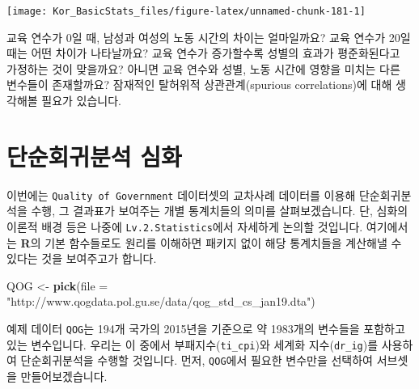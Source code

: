 \documentclass[]{book}
\newenvironment{Shaded}{\begin{snugshade}}{\end{snugshade}}
\newcommand{\DataTypeTok}[1]{\textcolor[rgb]{0.13,0.29,0.53}{#1}}
\newcommand{\KeywordTok}[1]{\textcolor[rgb]{0.13,0.29,0.53}{\textbf{#1}}}
\newcommand{\NormalTok}[1]{#1}
\newcommand{\OperatorTok}[1]{\textcolor[rgb]{0.81,0.36,0.00}{\textbf{#1}}}
\newcommand{\StringTok}[1]{\textcolor[rgb]{0.31,0.60,0.02}{#1}}
\begin{document}
\begin{itemize}
  \begin{center}\texttt{[image: Kor\_BasicStats\_files/figure-latex/unnamed-chunk-181-1]} \end{center}
\end{itemize}

교육 연수가 0일 때, 남성과 여성의 노동 시간의 차이는 얼마일까요? 교육 연수가 20일 때는 어떤 차이가 나타날까요? 교육 연수가 증가할수록 성별의 효과가 평준화된다고 가정하는 것이 맞을까요? 아니면 교육 연수와 성별, 노동 시간에 영향을 미치는 다른 변수들이 존재할까요? 잠재적인 탈허위적 상관관계(spurious correlations)에 대해 생각해볼 필요가 있습니다.

\hypertarget{uxb2e8uxc21cuxd68cuxadc0uxbd84uxc11d-uxc2ecuxd654}{%
\section{단순회귀분석 심화}\label{uxb2e8uxc21cuxd68cuxadc0uxbd84uxc11d-uxc2ecuxd654}}

이번에는 \texttt{Quality\ of\ Government} 데이터셋의 교차사례 데이터를 이용해 단순회귀분석을 수행, 그 결과표가 보여주는 개별 통계치들의 의미를 살펴보겠습니다. 단, 심화의 이론적 배경 등은 나중에 \texttt{Lv.2.Statistics}에서 자세하게 논의할 것입니다. 여기에서는 \textbf{R}의 기본 함수들로도 원리를 이해하면 패키지 없이 해당 통계치들을 계산해낼 수 있다는 것을 보여주고가 합니다.

\begin{Shaded}
\begin{Highlighting}[]
\NormalTok{QOG <-}\StringTok{ }\KeywordTok{pick}\NormalTok{(}\DataTypeTok{file =} \StringTok{"http://www.qogdata.pol.gu.se/data/qog_std_cs_jan19.dta"}\NormalTok{)}
\end{Highlighting}
\end{Shaded}

예제 데이터 \texttt{QOG}는 194개 국가의 2015년을 기준으로 약 1983개의 변수들을 포함하고 있는 변수입니다. 우리는 이 중에서 부패지수(\texttt{ti\_cpi})와 세계화 지수(\texttt{dr\_ig})를 사용하여 단순회귀분석을 수행할 것입니다. 먼저, \texttt{QOG}에서 필요한 변수만을 선택하여 서브셋을 만들어보겠습니다.

\begin{Shaded}
\end{Shaded}
\end{document}
